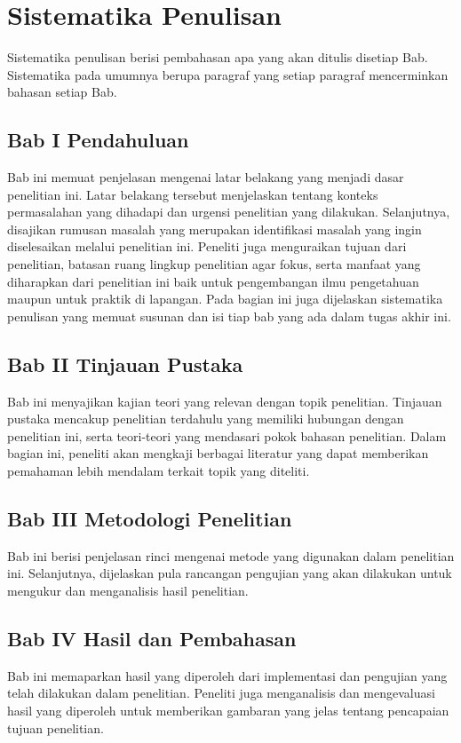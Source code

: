 \section{Sistematika Penulisan} \label{I.Sistematika}
Sistematika penulisan berisi pembahasan apa yang akan ditulis disetiap Bab. Sistematika pada umumnya berupa paragraf yang setiap paragraf mencerminkan bahasan setiap Bab. \par
\subsection{Bab I Pendahuluan}
Bab ini memuat penjelasan mengenai latar belakang yang menjadi dasar penelitian ini. Latar belakang tersebut menjelaskan tentang konteks permasalahan yang dihadapi dan urgensi penelitian yang dilakukan. Selanjutnya, disajikan rumusan masalah yang merupakan identifikasi masalah yang ingin diselesaikan melalui penelitian ini. Peneliti juga menguraikan tujuan dari penelitian, batasan ruang lingkup penelitian agar fokus, serta manfaat yang diharapkan dari penelitian ini baik untuk pengembangan ilmu pengetahuan maupun untuk praktik di lapangan. Pada bagian ini juga dijelaskan sistematika penulisan yang memuat susunan dan isi tiap bab yang ada dalam tugas akhir ini.

\subsection{Bab II Tinjauan Pustaka}
Bab ini menyajikan kajian teori yang relevan dengan topik penelitian. Tinjauan pustaka mencakup penelitian terdahulu yang memiliki hubungan dengan penelitian ini, serta teori-teori yang mendasari pokok bahasan penelitian. Dalam bagian ini, peneliti akan mengkaji berbagai literatur yang dapat memberikan pemahaman lebih mendalam terkait topik yang diteliti.

\subsection{Bab III Metodologi Penelitian}
Bab ini berisi penjelasan rinci mengenai metode yang digunakan dalam penelitian ini. Selanjutnya, dijelaskan pula rancangan pengujian yang akan dilakukan untuk mengukur dan menganalisis hasil penelitian.

\subsection{Bab IV Hasil dan Pembahasan}
Bab ini memaparkan hasil yang diperoleh dari implementasi dan pengujian yang telah dilakukan dalam penelitian. Peneliti juga menganalisis dan mengevaluasi hasil yang diperoleh untuk memberikan gambaran yang jelas tentang pencapaian tujuan penelitian.

